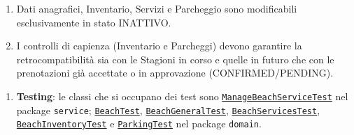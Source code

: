{
	\begin{enumerate}[nosep, leftmargin=*]
		\item[•] Dati anagrafici, Inventario, Servizi e Parcheggio sono modificabili esclusivamente in stato INATTIVO.
		\item[•] I controlli di capienza (Inventario e Parcheggi) devono garantire la retrocompatibilità sia con le Stagioni in corso e quelle in futuro che con le prenotazioni già accettate o in approvazione (CONFIRMED/PENDING).
	\end{enumerate}
	
	\begin{enumerate}[leftmargin=*]
		\item[•] \textbf{Testing}: le classi che si occupano dei test sono \hyperref[itm:application_beach]{\texttt{ManageBeachServiceTest}} nel package \texttt{service}; \hyperref[itm:domain_beach]{\texttt{BeachTest}}, \hyperref[itm:domain_beachsubclasses]{\texttt{BeachGeneralTest}}, \hyperref[itm:domain_beachsubclasses]{\texttt{BeachServicesTest}}, \hyperref[itm:domain_beachsubclasses]{\texttt{BeachInventoryTest}} e \hyperref[itm:domain_beachsubclasses]{\texttt{ParkingTest}} nel package \texttt{domain}.
	\end{enumerate}
}
